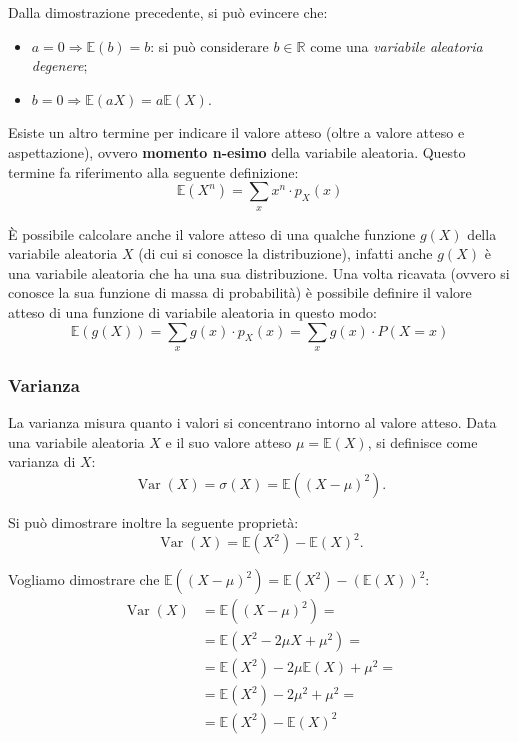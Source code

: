 \noindent Dalla dimostrazione precedente, si può evincere che: \begin{itemize}
    \item $a = 0 \Rightarrow \mathbb E (b) = b$: si può considerare $b \in \mathbb R$ come una \textit{variabile aleatoria degenere};
    \item $b = 0 \Rightarrow \mathbb E(aX) = a \mathbb E (X)$.
\end{itemize}

\noindent Esiste un altro termine per indicare il valore atteso (oltre a valore atteso e aspettazione), ovvero \textbf{momento n-esimo} della variabile aleatoria.
Questo termine fa riferimento alla seguente definizione: \[
\boxed{
\mathbb E(X^n) = \sum_{x} x^n \cdot p_X(x)}
\]

\noindent È possibile calcolare anche il valore atteso di una qualche funzione $g(X)$ della variabile aleatoria $X$ (di cui si conosce la distribuzione), infatti anche $g(X)$ è una variabile aleatoria che ha una sua distribuzione. Una volta ricavata 
(ovvero si conosce la sua funzione di massa di probabilità) è possibile definire il valore atteso di una funzione di variabile aleatoria in questo modo: \[
\boxed{
\mathbb E(g(X)) = \sum_{x} g(x) \cdot p_X(x) = \sum_{x} g(x) \cdot P(X = x)}
\]

\subsubsection{Varianza}
La varianza misura quanto i valori si concentrano intorno al valore atteso.
Data una variabile aleatoria $X$ e il suo valore atteso $\mu = \mathbb E(X)$, si definisce come varianza di $X$: \[
\boxed{\operatorname{Var}(X) =
\sigma(X) = \mathbb E \left((X - \mu)^2 \right)
}.
\]

\noindent Si può dimostrare inoltre la seguente proprietà: \[
\boxed{
\operatorname{Var}(X) = \mathbb{E}\left(X^2\right) - \mathbb{E}(X)^2
}.
\]

\begin{dimostrazione}
Vogliamo dimostrare che $\mathbb E \left((X - \mu)^2 \right) = \mathbb{E}\left(X^2\right) - (\mathbb{E}(X))^2$: \begin{align*}
\operatorname{Var}(X) &= \mathbb E \left((X - \mu)^2 \right) = \\
&= \mathbb E \left(X^2 - 2 \mu X + \mu ^2 \right) = \\
&= \mathbb E (X^2) - 2 \mu \mathbb E(X) + \mu^2 = \\
&= \mathbb E (X^2) - 2 \mu^2 + \mu^2 = \\
&= \mathbb E (X^2) - \mathbb E(X)^2 
\tag*{$\blacksquare$}
\end{align*}
\end{dimostrazione}

